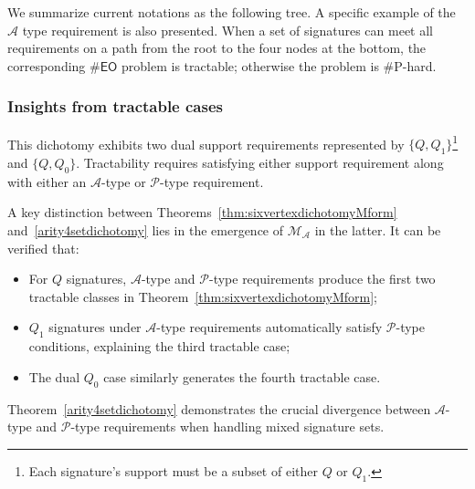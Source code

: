 \documentclass[a4paper,UKenglish,cleveref, autoref, thm-restate]{lipics-v2021}
\newcommand{\eo}[0]{\textsf{EO}}
\begin{document}
We summarize current notations as the following tree.  A specific example of the $\mathscr{A}$ type requirement is also presented. When a set of signatures can meet all requirements on a path from the root to the four nodes at the bottom, the corresponding $\#\eo$ problem is tractable; otherwise the problem is \#P-hard. 


\begin{center}
\end{center}


\subsubsection{Insights from tractable cases}
This dichotomy exhibits two dual support requirements represented by $\{Q,Q_1\}$\footnote{Each signature's support must be a subset of either $Q$ or $Q_1$.} and $\{Q,Q_0\}$. Tractability requires satisfying either support requirement along with either an $\mathscr{A}$-type or $\mathscr{P}$-type requirement.

A key distinction between Theorems~\ref{thm:sixvertexdichotomyMform} and~\ref{arity4setdichotomy} lies in the emergence of $\mathscr{M}_{\mathscr{A}}$ in the latter. It can be verified that:
\begin{itemize}
    \item For $Q$ signatures, $\mathscr{A}$-type and $\mathscr{P}$-type requirements produce the first two tractable classes in Theorem~\ref{thm:sixvertexdichotomyMform};
    \item $Q_1$ signatures under $\mathscr{A}$-type requirements automatically satisfy $\mathscr{P}$-type conditions, explaining the third tractable case;
    \item The dual $Q_0$ case similarly generates the fourth tractable case.
\end{itemize}

Theorem~\ref{arity4setdichotomy} demonstrates the crucial divergence between $\mathscr{A}$-type and $\mathscr{P}$-type requirements when handling mixed signature sets.
\end{document}
